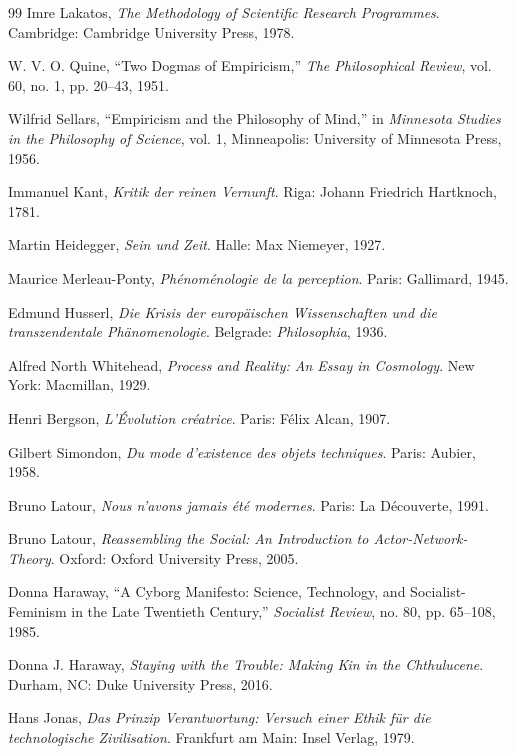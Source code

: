 \documentclass[11pt,oneside]{book}
\theoremstyle{definition}
\theoremstyle{remark}
\begin{document}
\begin{thebibliography}{99}
 Imre Lakatos, \emph{The Methodology of Scientific Research Programmes}. Cambridge: Cambridge
  University Press, 1978.

 W. V. O. Quine, ``Two Dogmas of Empiricism,'' \emph{The Philosophical Review}, vol. 60, no. 1,
  pp. 20--43, 1951.

 Wilfrid Sellars, ``Empiricism and the Philosophy of Mind,'' in \emph{Minnesota Studies in the
  Philosophy of Science}, vol. 1, Minneapolis: University of Minnesota Press, 1956.

 Immanuel Kant, \emph{Kritik der reinen Vernunft}. Riga: Johann Friedrich Hartknoch, 1781.

 Martin Heidegger, \emph{Sein und Zeit}. Halle: Max Niemeyer, 1927.

 Maurice Merleau-Ponty, \emph{Ph\'enom\'enologie de la perception}. Paris: Gallimard, 1945.

 Edmund Husserl, \emph{Die Krisis der europ\"aischen Wissenschaften und die transzendentale
  Ph\"anomenologie}. Belgrade: \emph{Philosophia}, 1936.

 Alfred North Whitehead, \emph{Process and Reality: An Essay in Cosmology}. New York: Macmillan,
  1929.

 Henri Bergson, \emph{L'\'Evolution cr\'eatrice}. Paris: F\'elix Alcan, 1907.

 Gilbert Simondon, \emph{Du mode d'existence des objets techniques}. Paris: Aubier, 1958.

 Bruno Latour, \emph{Nous n'avons jamais \'et\'e modernes}. Paris: La D\'ecouverte, 1991.

 Bruno Latour, \emph{Reassembling the Social: An Introduction to Actor-Network-Theory}. Oxford:
  Oxford University Press, 2005.

 Donna Haraway, ``A Cyborg Manifesto: Science, Technology, and Socialist-Feminism in the Late
  Twentieth Century,'' \emph{Socialist Review}, no. 80, pp. 65--108, 1985.

 Donna J. Haraway, \emph{Staying with the Trouble: Making Kin in the Chthulucene}. Durham, NC:
  Duke University Press, 2016.

 Hans Jonas, \emph{Das Prinzip Verantwortung: Versuch einer Ethik f\"ur die technologische
  Zivilisation}. Frankfurt am Main: Insel Verlag, 1979.


\end{thebibliography}
\end{document}
